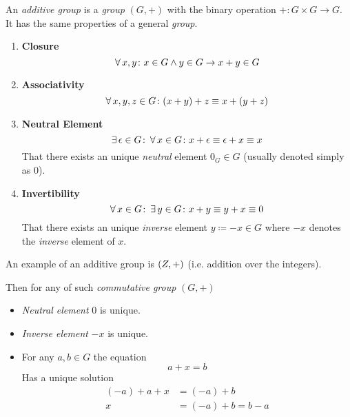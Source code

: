 \begin{definition}
    An \textit{additive group} is a \textit{group} $(G, +)$ with the binary operation $+ \colon G \times G \to G$. It has the same properties of a general \textit{group}.
    \begin{enumerate}
        \item \textbf{Closure}
        \begin{equation}
            \operatorname{\forall} x, y \colon x \in G \land y \in G \to x + y \in G
        \end{equation}
        \item \textbf{Associativity}
        \begin{equation}
            \operatorname{\forall} x, y, z \in G \colon (x + y) + z \equiv x + (y + z)
        \end{equation}
        \item \textbf{Neutral Element}
        \begin{equation}
            \operatorname{\exists} \epsilon \in G \colon \operatorname{\forall} x \in G \colon x + \epsilon \equiv \epsilon + x \equiv x
        \end{equation}
        That there exists an unique \textit{neutral} element $0_G \in G$ (usually denoted simply as $0$).
        \item \textbf{Invertibility}
        \begin{equation}
            \operatorname{\forall} x \in G \colon \operatorname{\exists} y \in G \colon x + y \equiv y + x \equiv 0
        \end{equation}
        That there exists an unique \textit{inverse} element $y \coloneqq -x \in G$ where $-x$ denotes the \textit{inverse} element of $x$.
    \end{enumerate}
\end{definition}

\begin{remark}
    An example of an additive group is $(\relax{Z}, +)$ (i.e. addition over the integers).
    
    Then for any of such \textit{commutative group} $(G, +)$
    \begin{itemize}
        \item \textit{Neutral element} $0$ is unique.
        \item \textit{Inverse element} $-x$ is unique.
        \item For any $a, b \in G$ the equation
        \begin{equation}
            a + x = b
        \end{equation}
        Has a unique solution
        \begin{align}
            (-a) + a + x &= (-a) + b \\
            x &= (-a) + b = b - a
        \end{align}
    \end{itemize}
\end{remark}

